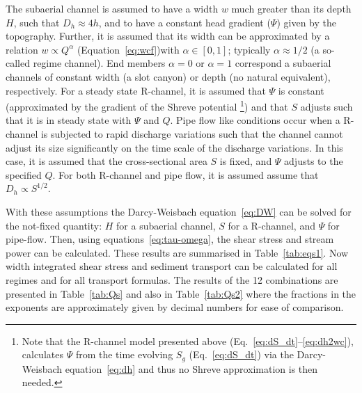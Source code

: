 \documentclass[draft]{agujournal2019}
\begin{document}
The  subaerial channel is assumed to have a width $w$ much greater than its depth $H$, such that $D_h\approx 4h$, and to have a constant head gradient ($\Psi$) given by the topography.
Further, it is  assumed that its width can be approximated by a relation $w \propto Q^\alpha$ (Equation~\ref{eq:wcf})with $\alpha\in [0,1]$; typically $\alpha \approx 1/2$ (a so-called regime channel).
End members $\alpha=0$ or $\alpha=1$ correspond a  subaerial channels of constant width (a slot canyon) or depth (no natural equivalent), respectively.
%
For a steady state R-channel, it is assumed that  $\Psi$ is constant (approximated by the gradient of the Shreve \citeyear{shreve1972} potential \footnote{Note that the R-channel model presented above (Eq.~\eqref{eq:dS_dt}--\eqref{eq:dh2wc}), calculates $\Psi$ from the time evolving $S_g$ (Eq.~\eqref{eq:dS_dt}) via the Darcy-Weisbach equation~\eqref{eq:dh} and thus no Shreve approximation is then needed.}) and that $S$ adjusts such that it is in steady state with $\Psi$ and $Q$.
%
Pipe flow like conditions occur when a R-channel is subjected to rapid discharge variations such that the channel cannot adjust its size significantly on the time scale of the discharge variations.
In this case, it is assumed that the cross-sectional area $S$ is fixed, and $\Psi$ adjusts to the specified $Q$.
For both R-channel and pipe flow, it is assumed assume that $D_h \propto S^{1/2}$.

With these assumptions the Darcy-Weisbach equation~\eqref{eq:DW} can be solved for the not-fixed quantity: $H$ for a  subaerial channel, $S$ for a R-channel, and $\Psi$ for pipe-flow.
Then, using equations~\eqref{eq:tau-omega}, the shear stress and stream power can be calculated.
These results are summarised in Table~\ref{tab:eqs1}.
Now width integrated shear stress and sediment transport can be calculated for all regimes and for all transport formulas.  The results of the 12 combinations are presented in Table~\ref{tab:Qs} and also in Table~\ref{tab:Qs2} where the fractions in the exponents are approximately given by decimal numbers for ease of comparison.
\end{document}
